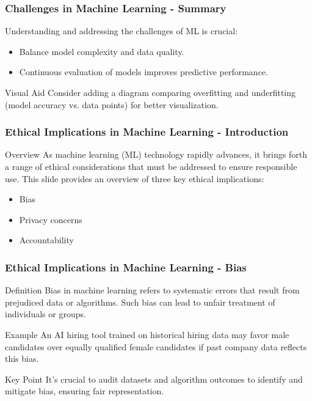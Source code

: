 \documentclass[aspectratio=169]{beamer}
\begin{document}
\begin{frame}[fragile]
    \frametitle{Challenges in Machine Learning - Summary}
    Understanding and addressing the challenges of ML is crucial:
    \begin{itemize}
        \item Balance model complexity and data quality.
        \item Continuous evaluation of models improves predictive performance.
    \end{itemize}
    \begin{block}{Visual Aid}
        Consider adding a diagram comparing overfitting and underfitting (model accuracy vs. data points) for better visualization.
    \end{block}
\end{frame}

\begin{frame}[fragile]
    \frametitle{Ethical Implications in Machine Learning - Introduction}
    \begin{block}{Overview}
        As machine learning (ML) technology rapidly advances, it brings forth a range of ethical considerations that must be addressed to ensure responsible use. This slide provides an overview of three key ethical implications: 
    \end{block}
    \begin{itemize}
        \item Bias
        \item Privacy concerns
        \item Accountability
    \end{itemize}
\end{frame}

\begin{frame}[fragile]
    \frametitle{Ethical Implications in Machine Learning - Bias}
    \begin{block}{Definition}
        Bias in machine learning refers to systematic errors that result from prejudiced data or algorithms. Such bias can lead to unfair treatment of individuals or groups.
    \end{block}
    \begin{block}{Example}
        An AI hiring tool trained on historical hiring data may favor male candidates over equally qualified female candidates if past company data reflects this bias.
    \end{block}
    \begin{block}{Key Point}
        It's crucial to audit datasets and algorithm outcomes to identify and mitigate bias, ensuring fair representation.
    \end{block}
\end{frame}
\end{document}
